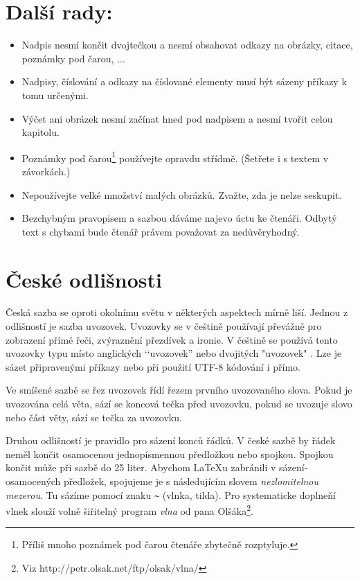 \documentclass[a4paper,twocolumn,10pt]{article}
\begin{document}
\section{Další rady:}


\begin{itemize}
   \item Nadpis nesmí končit dvojtečkou a nesmí obsahovat odkazy na obrázky, citace, poznámky pod čarou, ...
   \item 
Nadpisy, číslování a odkazy na číslované elementy musí být sázeny příkazy k tomu určenými.
   \item Výčet ani obrázek nesmí začínat hned pod nadpisem a nesmí tvořit celou kapitolu.

	\item Poznámky pod čarou\footnote{Příliš mnoho poznámek pod čarou čtenáře zbytečně rozptyluje.} používejte opravdu střídmě. (Šetřete i s textem v závorkách.)

	\item Nepoužívejte velké množství malých obrázků. Zvažte, zda je nelze seskupit.
	
	\item Bezchybným pravopisem a sazbou dáváme najevo úctu ke čtenáři. Odbytý text s chybami bude čtenář právem považovat za nedůvěryhodný.
\end{itemize}
 
\section{České odlišnosti}

Česká sazba se oproti okolní­mu světu v některých aspektech mí­rně liší­. Jednou z odlišností je sazba uvozovek. Uvozovky se v češtině použí­vají­ převážně pro zobrazení­ pří­mé řeči, zvýraznění­ přezdí­vek a ironie. V češtině se použí­vá  tento uvozovky typu  mí­sto anglických ‘‘uvozovek'' nebo dvojitých "uvozovek" . Lze je sázet připravenými příkazy nebo při použití UTF-8 kódování i přímo.

Ve smíšené sazbě se řez uvozovek ří­dí­ řezem první­ho uvozovaného slova. Pokud je uvozována celá věta, sází­ se koncová tečka před uvozovku, pokud se uvozuje slovo nebo část věty, sází­ se tečka za uvozovku.

Druhou odlišností je pravidlo pro sázení­ konců řádků. V české sazbě by řádek neměl končit osamocenou jednopí­smennou předložkou nebo spojkou. Spojkou  končit může při sazbě do 25 liter. Abychom \LaTeX u zabránili v sázení­ osamocených předložek, spojujeme je s následujícím slovem \textit{nezlomitelnou mezerou}. Tu sázíme pomocí znaku \verb|~| (vlnka, tilda). Pro systematicke doplneňí vlnek slouží volně šiřitelný program \textit{vlna} od pana Olšáka\footnote{Viz http://petr.olsak.net/ftp/olsak/vlna/}.
\end{document}
